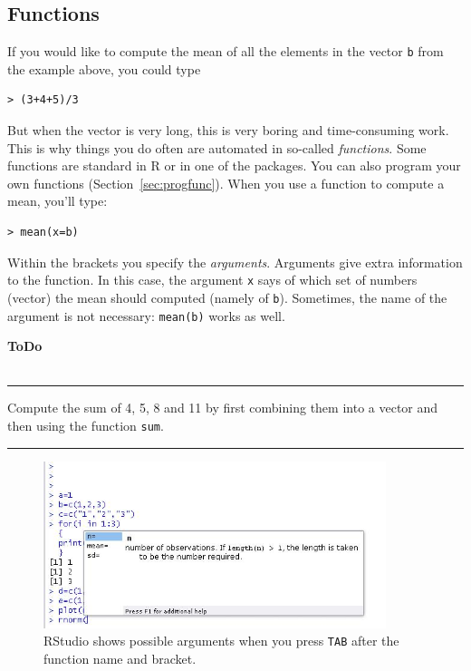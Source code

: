 \documentclass[a4paper,11pt,twocolumn,tablecaptionabove]{scrartcl}
\newenvironment{ToDo} {%
  \begin{flushright}
    \hfill
    \begin{minipage}{0.95\columnwidth}         %
    \textsf{\textbf{ToDo}} \\
      \vspace{-0.85cm}\\
      {\color{Gray}\rule[-0.1cm]{\columnwidth}{1.5pt}}} { %
      {\color{Gray} \rule[0.3cm]{\columnwidth}{1.5pt}}
    \end{minipage}
    \vspace{1em}
  \end{flushright}
  }
\begin{document}
\subsection{Functions}

If you would like to compute the mean of all the elements in the vector \texttt{b} from the example above, you could type 
\begin{Verbatim}[frame=single,gobble=0]
> (3+4+5)/3
\end{Verbatim}
But when the vector is very long, this is very boring and time-consuming work. This is why things you do often are automated in so-called \emph{functions}. Some functions are standard in R or in one of the packages. You can also program your own functions (Section~\ref{sec:progfunc}). When you use a function to compute a mean, you'll type:
\begin{Verbatim}[frame=single,gobble=0]
> mean(x=b)
\end{Verbatim}

Within the brackets you specify the \emph{arguments}. Arguments give extra information to the function. In this case, the argument \texttt{x} says of which set of numbers (vector) the mean should computed (namely of \texttt{b}). Sometimes, the name of the argument is not necessary: \texttt{mean(b)} works as well.

\begin{ToDo}
Compute the sum of 4, 5, 8 and 11 by first combining them into a vector and then using the function \texttt{sum}.\\
\end{ToDo}

\begin{figure}[htb]
  \centering
  \includegraphics[width=10cm, clip=true, trim=0cm 0cm 0cm 1cm]{img/tab_RStudio.jpg}
  \caption{RStudio shows possible arguments when you press \texttt{TAB} after the function name and bracket.}
  \label{fig:tab_RStudio}
\end{figure}
\end{document}
